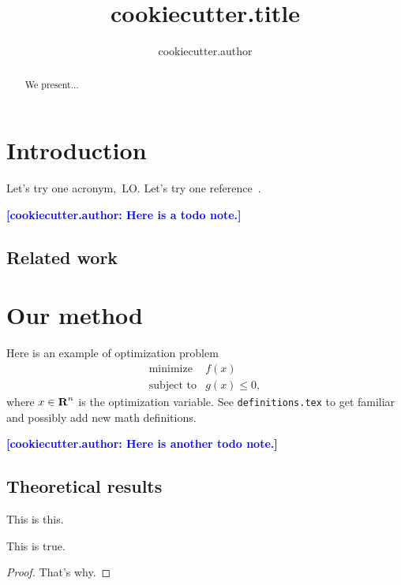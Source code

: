 \documentclass[12pt]{article}
\title{ {{cookiecutter.title}} }
\author{ {{cookiecutter.author}} }
\newcommand{\mynote}[1]{}
\renewcommand{\mynote}[1]{\textcolor{blue}{\textbf{[{{cookiecutter.author}}: #1]}}}
\begin{document}
\maketitle

\begin{abstract}
We present...
\end{abstract}



\section{Introduction}

Let's try one acronym,~\gls{LO}. Let's try one reference~\cite{conforti2014}.

\mynote{Here is a todo note.}


\subsection{Related work}

\section{Our method}

Here is an example of optimization problem
\begin{equation*}
	\begin{array}{ll}
		\text{minimize} & f(x)\\
		\text{subject to} & g(x)\le 0,
	\end{array}
\end{equation*}
where $x \in {\mbox{\bf R}}^n$ is the optimization variable.
See {\tt definitions.tex} to get familiar and possibly add new math definitions.


\mynote{Here is another todo note.}

\subsection{Theoretical results}%
\label{sub:theoretical_results}


\begin{definition}
	This is this.
\end{definition}


\begin{theorem}
	This is true.
\end{theorem}
\begin{proof}
	That's why.
\end{proof}
\end{document}
